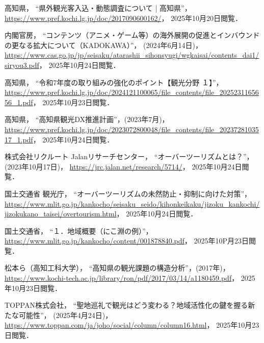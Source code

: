 \documentclass{docs}
\begin{document}
\begin{thebibliography}{99}
    高知県，
    “県外観光客入込・動態調査について | 高知県”，
    \url{https://www.pref.kochi.lg.jp/doc/2017090600162/}，
    2025年10月20日閲覧．

    内閣官房，
    “コンテンツ（アニメ・ゲーム等）の海外展開の促進とインバウンドの更なる拡大について（KADOKAWA）”，
    (2024年6月14日)，
    \url{https://www.cas.go.jp/jp/seisaku/atarashii_sihonsyugi/wgkaisai/contents_dai1/siryou3.pdf}，
    2025年10月24日閲覧．

    高知県，
    “令和7年度の取り組みの強化のポイント【観光分野 １】”，
    \url{https://www.pref.kochi.lg.jp/doc/2024121100065/file_contents/file_2025231165656_1.pdf}，
    2025年10月23日閲覧．

    高知県，
    “高知県観光DX推進計画”，(2023年7月)，
    \url{https://www.pref.kochi.lg.jp/doc/2023072800048/file_contents/file_2023728103517_1.pdf}，
    2025年10月24日閲覧．

    株式会社リクルート Jalanリサーチセンター，
    “オーバーツーリズムとは？”，(2023年10月17日)，
    \url{https://jrc.jalan.net/research/5714/}，
    2025年10月24日閲覧．

    国土交通省 観光庁，
    “オーバーツーリズムの未然防止・抑制に向けた対策”，
    \url{https://www.mlit.go.jp/kankocho/seisaku_seido/kihonkeikaku/jizoku_kankochi/jizokukano_taisei/overtourism.html}，
    2025年10月24日閲覧．

    国土交通省，
    “１．地域概要（にこ淵の例）”，
    \url{https://www.mlit.go.jp/kankocho/content/001878840.pdf}，
    2025年10P月23日閲覧．

    松本ら（高知工科大学），
    “高知県の観光課題の構造分析”，(2017年)，
    \url{https://www.kochi-tech.ac.jp/library/ron/pdf/2017/03/14/a1180459.pdf}，
    2025年10月23日閲覧．

    TOPPAN株式会社，
    “聖地巡礼で観光はどう変わる？地域活性化の鍵を握る新たな可能性”，
    (2025年4月24日)，
    \url{https://www.toppan.com/ja/joho/social/column/column16.html}，
    2025年10月23日閲覧．


\end{thebibliography}
\end{document}
